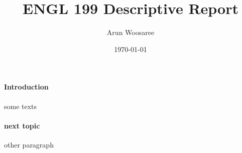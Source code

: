 \documentclass{article}
\title{ENGL 199 Descriptive Report}
\date{\today}
\author{Arun Woosaree}
\begin{document}
  \maketitle %

  \paragraph{Introduction}

  some texts

  \paragraph{next topic}

  other paragraph




  \newpage
\printbibliography
\end{document}
